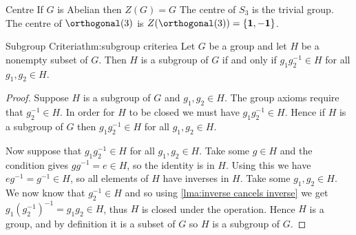 \documentclass[fleqn]{NotesClass}
\newcommand*{\ident}{\mathbf{1}}
\begin{document}
    \begin{exm}{Centre}{}
        If \(G\) is Abelian then \(Z(G) = G\)
        The centre of \(S_3\) is the trivial group.
        The centre of \(\orthogonal(3)\) is \(Z(\orthogonal(3)) = \{\ident, -\ident\}\).
    \end{exm}
    
    \begin{thm}{Subgroup Criteria}{thm:subgroup criteriea}
        Let \(G\) be a group and let \(H\) be a nonempty subset of \(G\).
        Then \(H\) is a subgroup of \(G\) if and only if \(g_1g_2^{-1} \in H\) for all \(g_1, g_2 \in H\).
        
        \begin{proof}
            Suppose \(H\) is a subgroup of \(G\) and \(g_1, g_2 \in H\).
            The group axioms require that \(g_2^{-1} \in H\).
            In order for \(H\) to be closed we must have \(g_1g_2^{-1} \in H\).
            Hence if \(H\) is a subgroup of \(G\) then \(g_1g_2^{-1} \in H\) for all \(g_1, g_2 \in H\).
            
            Now suppose that \(g_1g_2^{-1} \in H\) for all \(g_1, g_2 \in H\).
            Take some \(g \in H\) and the condition gives \(gg^{-1} = e \in H\), so the identity is in \(H\).
            Using this we have \(eg^{-1} = g^{-1} \in H\), so all elements of \(H\) have inverses in \(H\).
            Take some \(g_1, g_2 \in H\).
            We now know that \(g_2^{-1} \in H\) and so using \cref{lma:inverse cancels inverse} we get \(g_1(g_2^{-1})^{-1} = g_1g_2 \in H\), thus \(H\) is closed under the operation.
            Hence \(H\) is a group, and by definition it is a subset of \(G\) so \(H\) is a subgroup of \(G\).
        \end{proof}
    \end{thm}
    
\end{document}
